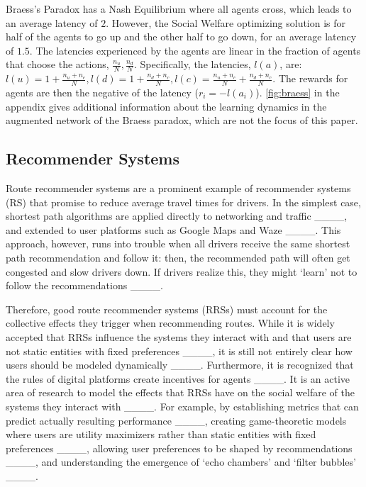 Braess's Paradox has a Nash Equilibrium where all agents cross, which leads to an average latency of $2$. However, the Social Welfare optimizing solution is for half of the agents to go up and the other half to go down, for an average latency of $1.5$. The latencies experienced by the agents are linear in the fraction of agents that choose the actions, $\frac{n_{u}}{N}, \frac{n_{d}}{N}$. Specifically, the latencies, $l(a)$, are: $l(u) = 1 + \frac{n_{u}+n_{c}}{N}, l(d) = 1 + \frac{n_{d}+n_{c}}{N}, l(c) = \frac{n_{u}+n_{c}}{N} + \frac{n_{d}+n_{c}}{N}$. The rewards for agents are then the negative of the latency ($r_i=-l(a_i)$). \autoref{fig:braess} in the appendix gives additional information about the learning dynamics in the augmented network of the Braess paradox, which are not the focus of this paper.


\subsection{Recommender Systems}

Route recommender systems are a prominent example of recommender systems (RS) that promise to reduce average travel times for drivers. In the simplest case, shortest path algorithms are applied directly to networking and traffic ____, and extended to user platforms such as Google Maps and Waze ____. This approach, however, runs into trouble when all drivers receive the same shortest path recommendation and follow it: then, the recommended path will often get congested and slow drivers down. If drivers realize this, they might `learn' not to follow the recommendations ____. 

Therefore, good route recommender systems (RRSs) must account for the collective effects they trigger when recommending routes. While it is widely accepted that RRSs influence the systems they interact with and that users are not static entities with fixed preferences ____, it is still not entirely clear how users should be modeled dynamically ____. Furthermore, it is recognized that the rules of digital platforms create incentives for agents ____. It is an active area of research to model the effects that RRSs have on the social welfare of the systems they interact with ____. For example, by establishing metrics that can predict actually resulting performance ____, creating game-theoretic models where users are utility maximizers rather than static entities with fixed preferences ____, allowing user preferences to be shaped by recommendations ____, and understanding the emergence of `echo chambers' and `filter bubbles' ____. 

